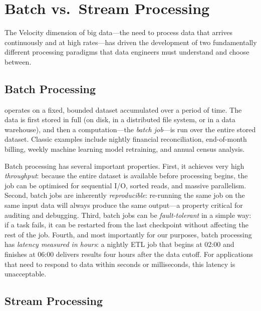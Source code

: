 \section{Batch vs.\ Stream Processing}
\label{sec:batch-stream}

The Velocity dimension of big data---the need to process data that
arrives continuously and at high rates---has driven the development of
two fundamentally different processing paradigms that data engineers must
understand and choose between.

\subsection{Batch Processing}
\label{subsec:batch}

 operates on a fixed, bounded dataset accumulated
over a period of time. The data is first stored in full (on disk, in a
distributed file system, or in a data warehouse), and then a
computation---the \emph{batch job}---is run over the entire stored
dataset. Classic examples include nightly financial reconciliation, end-of-month
billing, weekly machine learning model retraining, and annual census
analysis.

Batch processing has several important properties. First, it achieves
very high \emph{throughput}: because the entire dataset is available
before processing begins, the job can be optimised for sequential I/O,
sorted reads, and massive parallelism. Second, batch jobs are inherently
\emph{reproducible}: re-running the same job on the same input data will
always produce the same output---a property critical for auditing and
debugging. Third, batch jobs can be \emph{fault-tolerant} in a simple
way: if a task fails, it can be restarted from the last checkpoint
without affecting the rest of the job. Fourth, and most importantly for
our purposes, batch processing has \emph{latency measured in hours}: a
nightly ETL job that begins at 02:00 and finishes at 06:00 delivers
results four hours after the data cutoff. For applications that need to
respond to data within seconds or milliseconds, this latency is
unacceptable.

\subsection{Stream Processing}
\label{subsec:stream}

